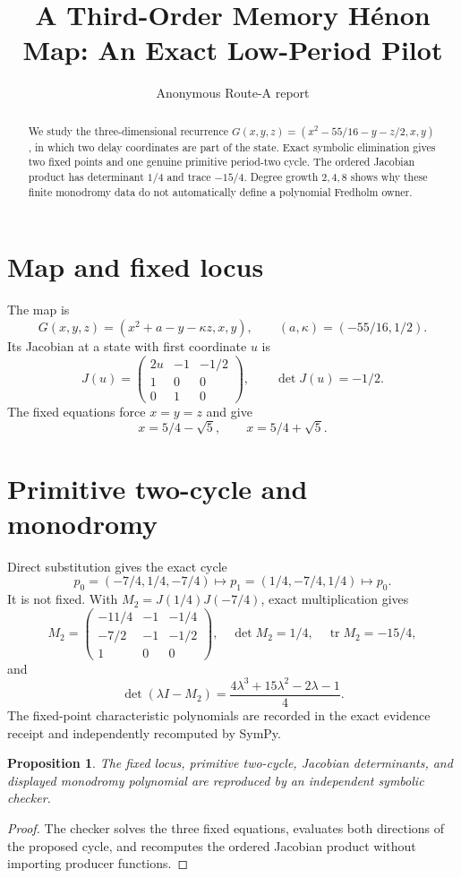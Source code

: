 \documentclass[10pt]{article}
\title{A Third-Order Memory H\'enon Map: An Exact Low-Period Pilot}
\author{Anonymous Route-A report}
\date{}
\newtheorem{proposition}{Proposition}
\begin{document}
\maketitle
\begin{abstract}
We study the three-dimensional recurrence
$G(x,y,z)=(x^2-55/16-y-z/2,x,y)$, in which two delay coordinates are part of
the state.  Exact symbolic elimination gives two fixed points and one genuine
primitive period-two cycle.  The ordered Jacobian product has determinant
$1/4$ and trace $-15/4$.  Degree growth $2,4,8$ shows why these finite
monodromy data do not automatically define a polynomial Fredholm owner.
\end{abstract}

\section{Map and fixed locus}
The map is
\[
 G(x,y,z)=(x^2+a-y-\kappa z,x,y),\qquad
 (a,\kappa)=(-55/16,1/2).
\]
Its Jacobian at a state with first coordinate $u$ is
\[
 J(u)=\begin{pmatrix}2u&-1&-1/2\\1&0&0\\0&1&0\end{pmatrix},
 \qquad \det J(u)=-1/2.
\]
The fixed equations force $x=y=z$ and give
\[
 x=5/4-\sqrt5,\qquad x=5/4+\sqrt5.
\]

\section{Primitive two-cycle and monodromy}
Direct substitution gives the exact cycle
\[
 p_0=(-7/4,1/4,-7/4)\longmapsto
 p_1=(1/4,-7/4,1/4)\longmapsto p_0.
\]
It is not fixed.  With $M_2=J(1/4)J(-7/4)$, exact multiplication gives
\[
 M_2=\begin{pmatrix}-11/4&-1&-1/4\\-7/2&-1&-1/2\\1&0&0\end{pmatrix},
 \quad \det M_2=1/4,\quad \operatorname{tr}M_2=-15/4,
\]
and
\[
 \det(\lambda I-M_2)=
 \frac{4\lambda^3+15\lambda^2-2\lambda-1}{4}.
\]
The fixed-point characteristic polynomials are recorded in the exact
evidence receipt and independently recomputed by SymPy.

\begin{proposition}
The fixed locus, primitive two-cycle, Jacobian determinants, and displayed
monodromy polynomial are reproduced by an independent symbolic checker.
\end{proposition}
\begin{proof}
The checker solves the three fixed equations, evaluates both directions of
the proposed cycle, and recomputes the ordered Jacobian product without
importing producer functions.
\end{proof}
\end{document}
